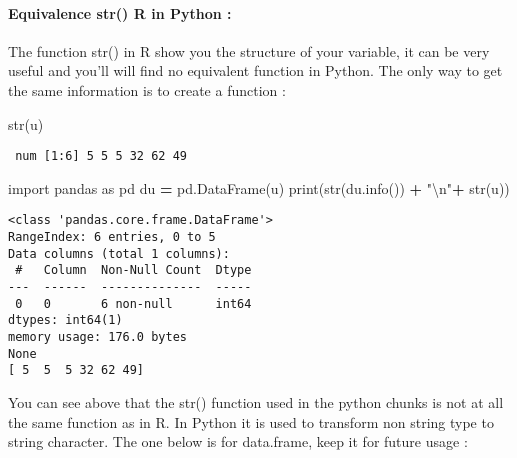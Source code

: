 \documentclass[
]{article}
\newenvironment{Shaded}{\begin{snugshade}}{\end{snugshade}}
\newcommand{\BuiltInTok}[1]{#1}
\newcommand{\CharTok}[1]{\textcolor[rgb]{0.31,0.60,0.02}{#1}}
\newcommand{\FunctionTok}[1]{\textcolor[rgb]{0.00,0.00,0.00}{#1}}
\newcommand{\ImportTok}[1]{#1}
\newcommand{\NormalTok}[1]{#1}
\newcommand{\OperatorTok}[1]{\textcolor[rgb]{0.81,0.36,0.00}{\textbf{#1}}}
\newcommand{\StringTok}[1]{\textcolor[rgb]{0.31,0.60,0.02}{#1}}
\begin{document}
\newline

\hypertarget{equivalence-str-r-in-python}{%
\paragraph{Equivalence str() R in Python
:}\label{equivalence-str-r-in-python}}

The function str() in R show you the structure of your variable, it can
be very useful and you'll will find no equivalent function in Python.
The only way to get the same information is to create a function :

\begin{Shaded}
\begin{Highlighting}[]
\FunctionTok{str}\NormalTok{(u)}
\end{Highlighting}
\end{Shaded}

\begin{verbatim}
 num [1:6] 5 5 5 32 62 49
\end{verbatim}

\begin{Shaded}
\begin{Highlighting}[]
\ImportTok{import}\NormalTok{ pandas }\ImportTok{as}\NormalTok{ pd}
\NormalTok{du }\OperatorTok{=}\NormalTok{ pd.DataFrame(u)}
\BuiltInTok{print}\NormalTok{(}\BuiltInTok{str}\NormalTok{(du.info()) }\OperatorTok{+} \StringTok{"}\CharTok{\textbackslash{}n}\StringTok{"}\OperatorTok{+} \BuiltInTok{str}\NormalTok{(u))}
\end{Highlighting}
\end{Shaded}

\begin{verbatim}
<class 'pandas.core.frame.DataFrame'>
RangeIndex: 6 entries, 0 to 5
Data columns (total 1 columns):
 #   Column  Non-Null Count  Dtype
---  ------  --------------  -----
 0   0       6 non-null      int64
dtypes: int64(1)
memory usage: 176.0 bytes
None
[ 5  5  5 32 62 49]
\end{verbatim}

You can see above that the str() function used in the python chunks is
not at all the same function as in R. In Python it is used to transform
non string type to string character. \newline \newline The one below is
for data.frame, keep it for future usage :
\end{document}
